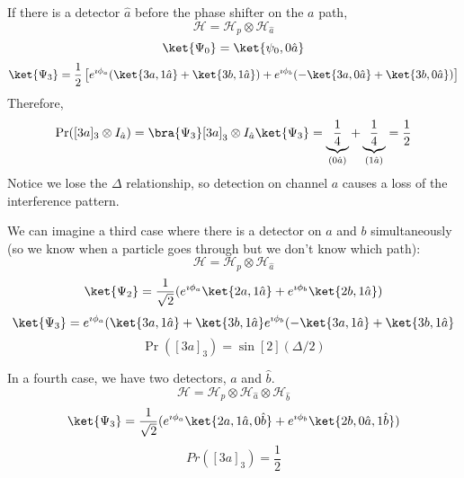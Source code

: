 \documentclass[a4paper,twoside,master.tex]{subfiles}
\begin{document}
If there is a detector $ \hat{a} $ before the phase shifter on the $ a $ path,
\begin{equation}
    \mathcal{H} = \mathcal{H}_p \otimes \mathcal{H}_{\hat{a}} 
\end{equation}
\begin{equation}
    \ket{\Psi_0} = \ket{\psi_0,0 \hat{a}} 
\end{equation}
\begin{equation}
    \ket{\Psi_3} = \frac{1}{2} \left[ e^{\imath\phi_a} (\ket{3a,1 \hat{a}} + \ket{3b,1 \hat{a}} ) + e^{\imath\phi_b} (- \ket{3a,0 \hat{a}} + \ket{3b,0 \hat{a}}) \right]
\end{equation}
Therefore,
\begin{equation}
    \Pr([3a]_3 \otimes I_{\hat{a}}) = \bra{\Psi_3}[3a]_3 \otimes I_{\hat{a}} \ket{\Psi_3} = \underbrace{ \frac{1}{4} }_{(0 \hat{a})} + \underbrace{ \frac{1}{4}}_{(1 \hat{a})} = \frac{1}{2}
\end{equation}
Notice we lose the $ \Delta $ relationship, so detection on channel $ a $ causes a loss of the interference pattern.

We can imagine a third case where there is a detector on $ a $ and $ b $ simultaneously (so we know when a particle goes through but we don't know which path):
\begin{equation}
    \mathcal{H} = \mathcal{H}_p \otimes \mathcal{H}_{\hat{a}}
\end{equation}
\begin{equation}
    \ket{\Psi_2} = \frac{1}{\sqrt{2}} ( e^{\imath\phi_a} \ket{2a,1 \hat{a}} + e^{\imath\phi_b} \ket{2b,1 \hat{a}})
\end{equation}
\begin{equation}
    \ket{\Psi_3} = e^{\imath\phi_a} (\ket{3a,1 \hat{a}} + \ket{3b,1 \hat{a}} e^{\imath\phi_b} (-\ket{3a,1 \hat{a}} + \ket{3b,1 \hat{a}} 
\end{equation}
\begin{equation}
    \Pr([3a]_3) = \sin[2](\Delta/2)
\end{equation}

In a fourth case, we have two detectors, $ \hat{a} $ and $ \hat{b} $.
\begin{equation}
    \mathcal{H} = \mathcal{H}_p \otimes \mathcal{H}_{\hat{a}} \otimes \mathcal{H}_{\hat{b}}
\end{equation}
\begin{equation}
    \ket{\Psi_3} = \frac{1}{\sqrt{2}} (e^{\imath\phi_a} \ket{2a,1 \hat{a},0 \hat{b}} + e^{\imath\phi_b} \ket{2b,0 \hat{a},1 \hat{b}})
\end{equation}
\begin{equation}
    Pr([3a]_3) = \frac{1}{2}
\end{equation}
\end{document}
